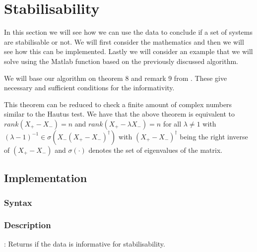 \section{Stabilisability}
In this section we will see how we can use the data to conclude if a set of systems are stabilisable or not. We will first consider the mathematics and then we will see how this can be implemented. Lastly we will consider an example that we will solve using the Matlab function based on the previously discussed algorithm.


We will base our algorithm on theorem 8 and remark 9 from \cite{waarde2019data}. These give necessary and sufficient conditions for the informativity.


This theorem can be reduced to check a finite amount of complex numbers similar to the Hautus test. We have that the above theorem is equivalent to $rank(X_+ - X_-) = n$ and $rank(X_+ - \lambda X_-) = n$ for all $\lambda \neq 1$ with $(\lambda - 1)^{-1} \in \sigma(X_- (X_+ - X_-)^\dagger)$ with $(X_+ - X_-)^\dagger$ being the right inverse of $(X_+ - X_-)$ and $\sigma(\cdot)$ denotes the set of eigenvalues of the matrix.




\subsection{Implementation}
\subsubsection*{Syntax}

\subsubsection*{Description}
: Returns if the data is informative for stabilisability.%

